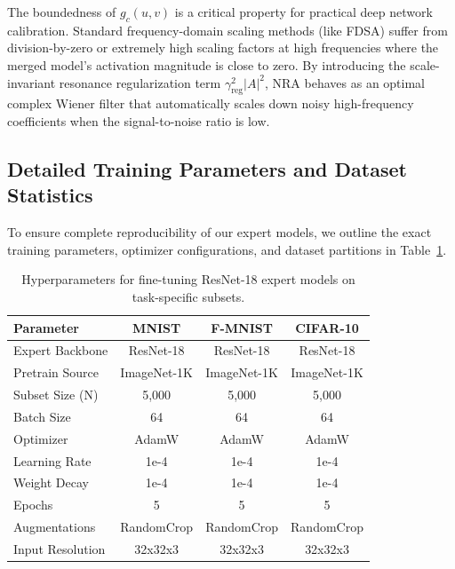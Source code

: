 \documentclass{article}
\theoremstyle{plain}
\theoremstyle{definition}
\theoremstyle{remark}
\begin{document}
The boundedness of $g_c(u, v)$ is a critical property for practical deep network calibration. Standard frequency-domain scaling methods (like FDSA) suffer from division-by-zero or extremely high scaling factors at high frequencies where the merged model's activation magnitude is close to zero. By introducing the scale-invariant resonance regularization term $\gamma_{\text{reg}}^2 |A|^2$, NRA behaves as an optimal complex Wiener filter that automatically scales down noisy high-frequency coefficients when the signal-to-noise ratio is low.

\subsection{Detailed Training Parameters and Dataset Statistics}
\label{appendix-params}
To ensure complete reproducibility of our expert models, we outline the exact training parameters, optimizer configurations, and dataset partitions in Table~\ref{tab:training_params}.

\begin{table}[H]
\caption{Hyperparameters for fine-tuning ResNet-18 expert models on task-specific subsets.}
\label{tab:training_params}
\begin{center}
\setlength{\tabcolsep}{3.5pt}
\begin{scriptsize}
\begin{tabular}{lccc}
\toprule
Parameter & MNIST & F-MNIST & CIFAR-10 \\
\midrule
Expert Backbone & ResNet-18 & ResNet-18 & ResNet-18 \\
Pretrain Source & ImageNet-1K & ImageNet-1K & ImageNet-1K \\
Subset Size (N) & 5,000 & 5,000 & 5,000 \\
Batch Size & 64 & 64 & 64 \\
Optimizer & AdamW & AdamW & AdamW \\
Learning Rate & 1e-4 & 1e-4 & 1e-4 \\
Weight Decay & 1e-4 & 1e-4 & 1e-4 \\
Epochs & 5 & 5 & 5 \\
Augmentations & RandomCrop & RandomCrop & RandomCrop \\
Input Resolution & 32x32x3 & 32x32x3 & 32x32x3 \\
\bottomrule
\end{tabular}
\end{scriptsize}
\end{center}
\end{table}
\end{document}
